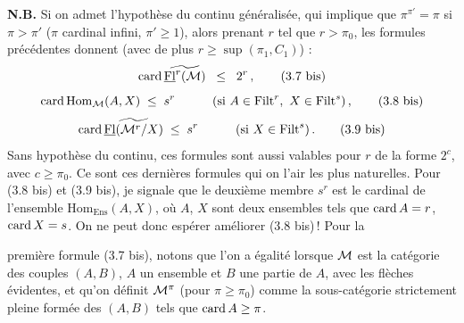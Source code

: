 \textbf{N.B.} Si on admet l'hypothèse du continu généralisée, qui implique que $\pi^{\pi'}=\pi$ si $\pi>\pi'$ ($\pi$ cardinal infini, $\pi'\geq1$), alors prenant $r$ tel que $r>\pi_0$, les formules précédentes donnent (avec de plus $r\geq\sup(\pi_1,C_1)$) :
\[
\operatorname{card}\widetilde{\underline{\mathrm{Fl}}^r(\mathcal{M})} \;\;\leq\;\; 2^r\,,
\tag*{(3.7 bis)}
\]
\[
\operatorname{card}\mathrm{Hom}_{\mathcal{M}}(A,X) \;\leq\; s^r \qquad\quad (\text{si } A\in\mathrm{Filt}^r,\ X\in\mathrm{Filt}^s)\,,
\tag*{(3.8 bis)}
\]
\[
\operatorname{card}\widetilde{\underline{\mathrm{Fl}}(\mathcal{M}^r/X)} \;\leq\; s^r \qquad\quad (\text{si } X\in\mathrm{Filt}^s)\,.
\tag*{(3.9 bis)}
\]
Sans hypothèse du continu, ces formules sont aussi valables pour $r$ de la forme $2^c$, avec $c\geq\pi_0$. Ce sont ces dernières formules qui on l'air les plus naturelles. Pour (3.8 bis) et %
(3.9 bis), je signale que le deuxième membre $s^r$ est le cardinal de l'ensemble $\mathrm{Hom}_{\mathrm{Ens}}(A,X)$, où $A$, $X$ sont deux ensembles tels que $\operatorname{card} A=r$, $\operatorname{card} X=s$. On ne peut donc espérer améliorer (3.8 bis)\,! Pour la

première formule (3.7 bis), notons que l'on a égalité lorsque $\mathcal{M}$ est la catégorie des couples $(A,B)$, $A$ un ensemble et $B$ une partie de $A$, avec les flèches évidentes, et qu'on définit $\mathcal{M}^\pi$ (pour $\pi\geq\pi_0$) comme la sous-catégorie strictement pleine formée des $(A,B)$ tels que $\operatorname{card} A\geq\pi$.

